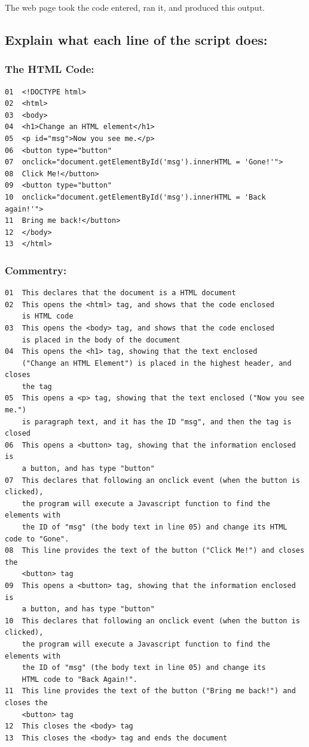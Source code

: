 \documentclass[a4paper]{article}
\begin{document}
The web page took the code entered, ran it, and produced this output.
\newpage
\subsection{Explain what each line of the script does:}
\subsubsection{The HTML Code:}
\begin{lstlisting}
01	<!DOCTYPE html>
02	<html>
03	<body>
04	<h1>Change an HTML element</h1>
05	<p id="msg">Now you see me.</p>
06	<button type="button"
07	onclick="document.getElementById('msg').innerHTML = 'Gone!'">
08	Click Me!</button>
09	<button type="button"
10	onclick="document.getElementById('msg').innerHTML = 'Back again!'">
11	Bring me back!</button>
12	</body>
13	</html>
\end{lstlisting}
\subsubsection{Commentry:}

\begin{lstlisting}
01	This declares that the document is a HTML document
02	This opens the <html> tag, and shows that the code enclosed 
	is HTML code
03	This opens the <body> tag, and shows that the code enclosed 
	is placed in the body of the document
04	This opens the <h1> tag, showing that the text enclosed 
	("Change an HTML Element") is placed in the highest header, and closes
	the tag
05	This opens a <p> tag, showing that the text enclosed ("Now you see me.")
	is paragraph text, and it has the ID "msg", and then the tag is closed
06	This opens a <button> tag, showing that the information enclosed is 
	a button, and has type "button"
07	This declares that following an onclick event (when the button is clicked),
	the program will execute a Javascript function to find the elements with 
	the ID of "msg" (the body text in line 05) and change its HTML code to "Gone".
08	This line provides the text of the button ("Click Me!") and closes the 
	<button> tag
09	This opens a <button> tag, showing that the information enclosed is 
	a button, and has type "button"
10	This declares that following an onclick event (when the button is clicked),
	the program will execute a Javascript function to find the elements with 
	the ID of "msg" (the body text in line 05) and change its 
	HTML code to "Back Again!".
11	This line provides the text of the button ("Bring me back!") and closes the 
	<button> tag
12	This closes the <body> tag
13	This closes the <body> tag and ends the document
\end{lstlisting}
\newpage
\end{document}
